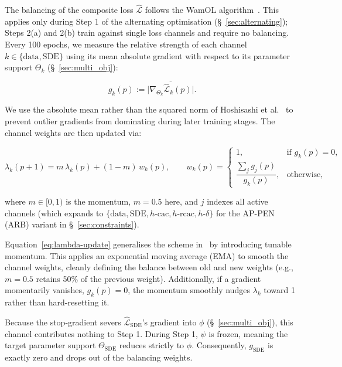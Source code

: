 \documentclass[11pt, a4paper]{article}
\begin{document}
The balancing of the composite loss $\hat{\mathcal{L}}$ follows the WamOL algorithm~\cite{Hoshisashi2024Whack-a-moleSurface}. This applies only during Step 1 of the alternating optimisation (\S~\ref{sec:alternating}); Steps 2(a) and 2(b) train against single loss channels and require no balancing. Every 100 epochs, we measure the relative strength of each channel $k \in \{\text{data}, \text{SDE}\}$ using its mean absolute gradient with respect to its parameter support $\Theta_k$ (\S~\ref{sec:multi_obj}):

\begin{equation}
g_k(p) := \overline{\big\lvert \nabla_{\Theta_k} \hat{\mathcal{L}}_k(p) \big\rvert}.
\label{eq:gradnorm}
\end{equation}

We use the absolute mean rather than the squared norm of Hoshisashi et al.~\cite{Hoshisashi2024Physics-InformedPDEs} to prevent outlier gradients from dominating during later training stages. The channel weights are then updated via:

\begin{equation}
\lambda_k(p+1) = m\,\lambda_k(p) + (1-m)\, w_k(p),
\qquad
w_k(p) =
\begin{cases}
1, & \text{if } g_k(p) = 0, \\[4pt]
\dfrac{\sum_{j} g_j(p)}{g_k(p)}, & \text{otherwise},
\end{cases}
\label{eq:lambda-update}
\end{equation}

where $m \in [0,1)$ is the momentum, $m=0.5$ here, and $j$ indexes all active channels (which expands to $\{\text{data}, \text{SDE}, h\text{-cac}, h\text{-rcac}, h\text{-}\delta\}$ for the AP-PEN (ARB) variant in \S~\ref{sec:constraints}). 

Equation~\ref{eq:lambda-update} generalises the scheme in~\cite{Hoshisashi2024Physics-InformedPDEs} by introducing tunable momentum. This applies an exponential moving average (EMA) to smooth the channel weights, cleanly defining the balance between old and new weights (e.g., $m=0.5$ retains 50\% of the previous weight). Additionally, if a gradient momentarily vanishes, $g_k(p)=0$, the momentum smoothly nudges $\lambda_k$ toward 1 rather than hard-resetting it.

Because the stop-gradient severs $\hat{\mathcal{L}}_{\text{SDE}}$'s gradient into $\phi$ (\S~\ref{sec:multi_obj}), this channel contributes nothing to Step 1. During Step 1, $\psi$ is frozen, meaning the target parameter support $\Theta_{\text{SDE}}$ reduces strictly to $\phi$. Consequently, $g_{\text{SDE}}$ is exactly zero and drops out of the balancing weights.
\end{document}
